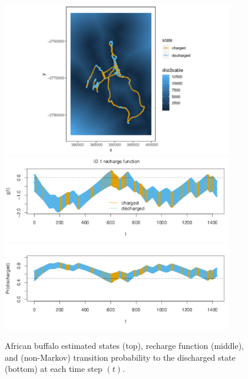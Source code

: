\documentclass[12pt]{article}\usepackage[]{graphicx}\usepackage[]{color}
\begin{document}
\begin{figure}[htbp]
  \centering
  \includegraphics[width=0.9\textwidth]{plot_buffaloStates.pdf}\\
  \includegraphics[width=0.9\textwidth]{plot_buffaloExample011.pdf}\\
  \includegraphics[width=0.9\textwidth]{plot_buffaloResults.pdf}\\
  \caption{African buffalo estimated states (top), recharge function (middle), and (non-Markov) transition probability to the discharged state (bottom) at each time step $(t)$.}
  \label{fig:recharge}
\end{figure}
\end{document}
